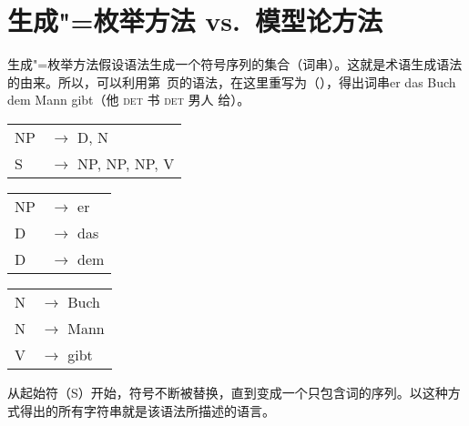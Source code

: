 
\chapter{生成"=枚举方法 vs.\ 模型论方法}
\label{Abschnitt-Generativ-Modelltheoretisch}

生成"=枚举方法假设语法生成一个符号序列的集合（词串）。这就是术语生成语法 的由来。所以，可以利用第~\pageref{bsp-grammatik-psg}页的语法，在这里重写为（），得出词串er das Buch dem Mann gibt（他 \textsc{det} 书 \textsc{det} 男人 给）。
\ea
\label{bsp-grammatik-psg-zwei}
\begin{tabular}[t]{@{}l@{ }l}
{NP} & {$\to$ D, N}\\          
{S}  & {$\to$ NP, NP, NP, V}
\end{tabular}\hspace{2cm}%
\begin{tabular}[t]{@{}l@{ }l}
{NP} & {$\to$ er}\\
{D}  & {$\to$ das}\\
{D}  & {$\to$ dem}\\
\end{tabular}\hspace{8mm}
\begin{tabular}[t]{@{}l@{ }l}
{N} & {$\to$ Buch}\\
{N} & {$\to$ Mann}\\
{V} & {$\to$ gibt}\\
\end{tabular}
\z
从起始符（S）开始，符号不断被替换，直到变成一个只包含词的序列。以这种方式得出的所有字符串就是该语法所描述的语言。

